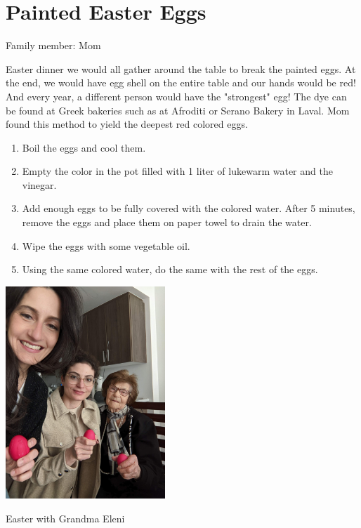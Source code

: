 \chapter{Painted Easter Eggs}
\label{ch:eastereggs}

Family member: Mom


 Easter dinner we would all gather around the table to break the painted eggs. At the end, we would have egg shell on the entire table and our hands would be red! And every year, a different person would have the "strongest" egg!     The dye can be found at Greek bakeries such as at Afroditi or Serano Bakery in Laval. Mom found this method to yield the deepest red colored eggs.

\begin{enumerate}
    \item Boil the eggs and cool them.
    \item Empty the color in the pot filled with 1 liter of lukewarm water and the vinegar.
    \item Add enough eggs to be fully covered with the colored water. After 5 minutes, remove the eggs and place them on paper towel to drain the water.
    \item Wipe the eggs with some vegetable oil.
    \item Using the same colored water, do the same with the rest of the eggs. 
\end{enumerate}

\begin{marginfigure}[20pt]
  \includegraphics[width=60mm]{monanteras/images/Easter eggs with grandma.jpg}
  \caption{Easter with Grandma Eleni}
\end{marginfigure}

